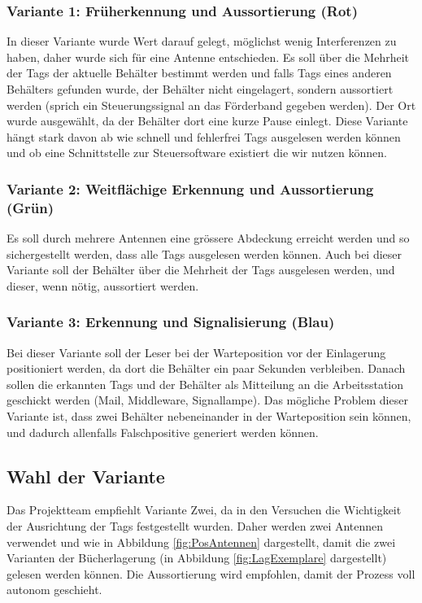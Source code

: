 \subsubsection{Variante 1: Früherkennung und Aussortierung (Rot)}
In dieser Variante wurde Wert darauf gelegt, möglichst wenig Interferenzen zu haben, daher wurde sich für eine Antenne entschieden. Es soll über die Mehrheit der Tags der aktuelle Behälter bestimmt werden und falls Tags eines anderen Behälters gefunden wurde, der Behälter nicht eingelagert, sondern aussortiert werden (sprich ein Steuerungssignal an das Förderband gegeben werden). Der Ort wurde ausgewählt, da der Behälter dort eine kurze Pause einlegt. Diese Variante hängt stark davon ab wie schnell und fehlerfrei Tags ausgelesen werden können und ob eine Schnittstelle zur Steuersoftware existiert die wir nutzen können.

\subsubsection{Variante 2: Weitflächige Erkennung und Aussortierung (Grün)}
Es soll durch mehrere Antennen eine grössere Abdeckung erreicht werden und so sichergestellt werden, dass alle Tags ausgelesen werden können. Auch bei dieser Variante soll der Behälter über die Mehrheit der Tags ausgelesen werden, und dieser, wenn nötig, aussortiert werden.

\subsubsection{Variante 3: Erkennung und Signalisierung (Blau)}
Bei dieser Variante soll der Leser bei der Warteposition vor der Einlagerung positioniert werden, da dort die Behälter ein paar Sekunden verbleiben. Danach sollen die erkannten Tags und der Behälter als Mitteilung an die Arbeitsstation geschickt werden (Mail, Middleware, Signallampe). Das mögliche Problem dieser Variante ist, dass zwei Behälter nebeneinander in der Warteposition sein können, und dadurch allenfalls Falschpositive generiert werden können.

\subsection{Wahl der Variante}

Das Projektteam empfiehlt Variante Zwei, da in den Versuchen die Wichtigkeit der Ausrichtung der Tags festgestellt wurden. Daher werden zwei Antennen verwendet und wie in Abbildung \ref{fig:PosAntennen} dargestellt, damit die zwei Varianten der Bücherlagerung (in Abbildung \ref{fig:LagExemplare} dargestellt) gelesen werden können. Die Aussortierung wird empfohlen, damit der Prozess voll autonom geschieht.

